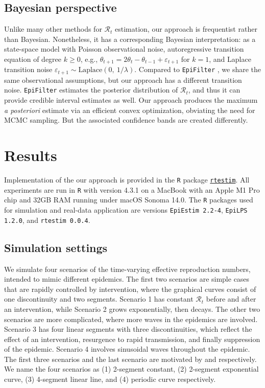 \documentclass[10pt,letterpaper]{article}
\def\calR{\mathcal{R}}
\newcommand{\citep}[1]{\cite{#1}}
\begin{document}
\subsection{Bayesian perspective}

Unlike many other methods for $\calR_t$ estimation, our approach is frequentist
rather than Bayesian. Nonetheless, it has a corresponding Bayesian
interpretation: as a state-space model with Poisson observational noise,
autoregressive transition equation of degree $k\geq 0$, e.g., $\theta_{t+1} =
2\theta_t - \theta_{t-1} + \varepsilon_{t+1}$ for $k=1$, and Laplace transition
noise $\varepsilon_{t+1}\sim \mathrm{Laplace}(0,\ 1/\lambda)$. Compared to
\texttt{EpiFilter} \citep{parag2021improved},
 we share the same observational assumptions, but our approach has a
different transition noise. \texttt{EpiFilter} estimates the posterior
distribution of
$\calR_t$, and thus it can provide credible interval estimates as well. Our
approach produces the maximum \emph{a posteriori} estimate via an efficient
convex optimization, obviating the need for MCMC sampling. But the associated
confidence bands are created differently.


\section{Results}

Implementation of the our approach is provided in the \texttt{R} package
\href{https://dajmcdon.github.io/rtestim/}{\texttt{rtestim}}. All experiments
are run in \texttt{R} with version 4.3.1 on a MacBook with an Apple M1 Pro chip
and 32GB RAM running under macOS Sonoma 14.0. The \texttt{R} packages used for
simulation and real-data application are versions \texttt{EpiEstim 2.2-4},
\texttt{EpiLPS 1.2.0}, and \texttt{rtestim 0.0.4}. 

\subsection{Simulation settings}

We simulate four scenarios of the time-varying effective reproduction numbers,
intended to mimic different epidemics. The first two scenarios are simple cases
that are rapidly controlled by intervention, where the graphical curves consist
of one discontinuity and two segments. Scenario 1 has constant $\calR_t$ before
and after an intervention, while Scenario 2 grows exponentially, then decays.
The other two scenarios are more complicated, where more waves in the epidemics
are involved. Scenario 3 has four linear segments with three discontinuities,
which reflect the effect of an intervention, resurgence to rapid transmission,
and finally suppression of the epidemic. Scenario 4 involves sinusoidal waves
throughout the epidemic.
The first three scenarios and the last scenario are motivated by
\cite{parag2021improved} and \cite{gressani2022epilps} respectively. 
We name the four scenarios as (1) 2-segment constant, (2) 2-segment exponential 
curve, (3) 4-segment linear line, and (4) periodic curve respectively. 
\end{document}
